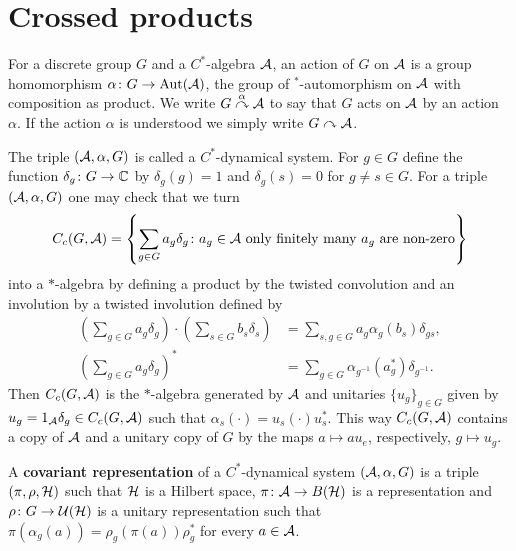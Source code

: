 \section{Crossed products}
\begin{definition}
For a discrete group $G$ and a $C^*$-algebra $\mathcal{A}$, an action of $G$ on $\mathcal{A}$ is a group homomorphism $\alpha \colon G \to \operatorname{Aut}(\mathcal{A})$, the group of $^*$-automorphism on $\mathcal{A}$ with composition as product. We write $G \stackrel{\alpha}{\curvearrowright} \mathcal{A}$ to say that $G$ acts on $\mathcal{A}$ by an action $\alpha$. If the action $\alpha$ is understood we simply write $G \curvearrowright \mathcal{A}$.
\end{definition}

The triple $(\mathcal{A}, \alpha,G)$ is called a $C^*$-dynamical system. For $g \in G$ define the function $\delta_g \colon G \to \mathbb{C}$ by $\delta_g(g)=1$ and $\delta_g(s)=0$ for $g \neq s \in G$.
For a triple $(\mathcal{A},\alpha,G)$ one may check that we turn 
\begin{align*}
\cc(G,\A)=\left\{\sum_{g \in G}a_{g}\delta_{g} \colon a_{g} \in \A\ \text{only
finitely many $a_{g}$ are non-zero}\right\}
\end{align*}
into a $*$-algebra by defining a product by the twisted convolution and an involution by a twisted involution defined by
\begin{align*}
\left(\sum_{g \in G}a_{g}\delta_{g} \right) \cdot \left( \sum_{s \in G}b_{s}\delta_{s}\right) &= \sum_{s,g \in G} a_{g} \alpha_{g}(b_{s})\delta_{gs}, \\ \left(\sum_{g \in G}a_{g}\delta_{g}\right)^*&=\sum_{g \in G}\alpha_{g^{-1}}(a_{g}^*)\delta_{g^{-1}}.
\end{align*}
Then $C_c(G,\mathcal{A})$ is the $*$-algebra generated by $\mathcal{A}$ and unitaries $\{u_{g} \}_{g \in G}$ given by $u_{g}=1_{\mathcal{A}} \delta_{g} \in C_c(G,\mathcal{A})$ such that $\alpha_{s}(\cdot)=u_{s}(\cdot)u_{s}^*$. This way $C_c(G,\mathcal{A})$ contains a copy of $\mathcal{A}$ and a unitary copy of $G$ by the maps $a \mapsto a u_{e}$, respectively, $g \mapsto u_{g}$. 

\begin{definition}
A \textbf{covariant representation} of a $C^*$-dynamical system
$(\mathcal{A},\alpha,G)$ is a triple $(\pi,\rho,\mathcal{H})$ such that $\mathcal{H}$ is a Hilbert space,
$\pi \colon \mathcal{A} \to B(\mathcal{H})$ is a representation and $\rho \colon G \to
\mathcal{U}(\mathcal{H})$ is a unitary representation such that $\pi(
\alpha_{g}(a))=\rho_{g}(\pi(a))\rho_{g}^*$ for every $a \in \mathcal{A}$. 
\end{definition}

